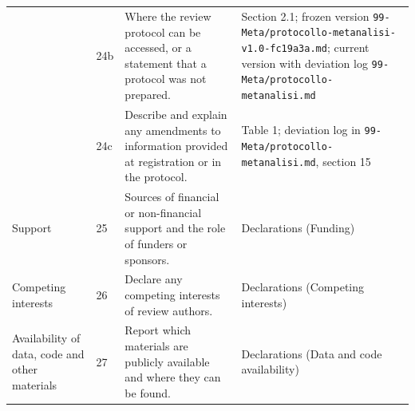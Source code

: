 \documentclass[10pt,a4paper]{article}
\begin{document}
\begin{longtable}{L{2.6cm}L{0.7cm}L{7.6cm}L{5.2cm}}
 & 24b & Where the review protocol can be accessed, or a statement that a protocol was not prepared. & Section 2.1; frozen version \texttt{99-Meta/protocollo-metanalisi-v1.0-fc19a3a.md}; current version with deviation log \texttt{99-Meta/protocollo-metanalisi.md} \\
 & 24c & Describe and explain any amendments to information provided at registration or in the protocol. & Table 1; deviation log in \texttt{99-Meta/protocollo-metanalisi.md}, section 15 \\
Support & 25 & Sources of financial or non-financial support and the role of funders or sponsors. & Declarations (Funding) \\
Competing interests & 26 & Declare any competing interests of review authors. & Declarations (Competing interests) \\
Availability of data, code and other materials & 27 & Report which materials are publicly available and where they can be found. & Declarations (Data and code availability) \\
\bottomrule
\end{longtable}

\end{document}
